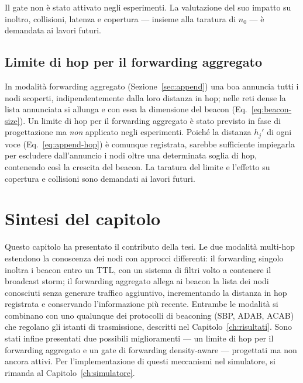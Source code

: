 Il gate non \`e stato attivato negli esperimenti. La valutazione del suo impatto su inoltro,
collisioni, latenza e copertura --- insieme alla taratura di $n_0$ --- \`e demandata ai lavori
futuri.

\subsection{Limite di hop per il forwarding aggregato}
\label{sec:append-hoplimit}
In modalit\`a forwarding aggregato (Sezione~\ref{sec:append}) una boa annuncia tutti i nodi scoperti,
indipendentemente dalla loro distanza in hop; nelle reti dense la lista annunciata si
allunga e con essa la dimensione del beacon (Eq.~\ref{eq:beacon-size}). Un limite di hop
per il forwarding aggregato \`e stato previsto in fase di progettazione ma
\emph{non} applicato negli esperimenti. Poich\'e la distanza $h_j'$ di ogni voce (Eq.~\ref{eq:append-hop})
\`e comunque registrata, sarebbe sufficiente impiegarla per escludere dall'annuncio i
nodi oltre una determinata soglia di hop, contenendo cos\`i la crescita del beacon. La
taratura del limite e l'effetto su copertura e collisioni sono demandati ai lavori
futuri.

\section*{Sintesi del capitolo}
Questo capitolo ha presentato il contributo della tesi. Le due modalit\`a multi-hop
estendono la conoscenza dei nodi con approcci differenti: il forwarding singolo inoltra i
beacon entro un TTL, con un sistema di filtri volto a contenere il broadcast storm; 
il forwarding aggregato allega ai beacon la lista dei nodi conosciuti 
senza generare traffico aggiuntivo, incrementando la distanza
in hop registrata e conservando l'informazione pi\`u recente. 
Entrambe le modalit\`a si combinano con uno qualunque dei protocolli di
beaconing (SBP, ADAB, ACAB) che regolano gli istanti di trasmissione, descritti nel
Capitolo~\ref{ch:risultati}. Sono stati infine presentati due possibili miglioramenti ---
un limite di hop per il forwarding aggregato e un gate di forwarding density-aware --- progettati ma non
ancora attivi. Per l'implementazione di questi meccanismi nel simulatore, si rimanda al Capitolo~\ref{ch:simulatore}.
